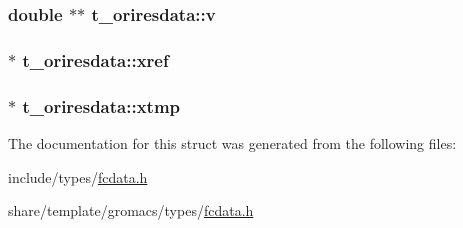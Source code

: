 \hypertarget{structt__oriresdata_a8164b713956e605372e8b0d2616bd053}{
\subsubsection[{v}]{\setlength{\rightskip}{0pt plus 5cm}double $\ast$$\ast$ {\bf t\-\_\-oriresdata\-::v}}}\label{structt__oriresdata_a8164b713956e605372e8b0d2616bd053}
\hypertarget{structt__oriresdata_a04fdaf3b7dfc576cddd0b41cc74738fc}{
\subsubsection[{xref}]{ $\ast$ {\bf t\-\_\-oriresdata\-::xref}}}\label{structt__oriresdata_a04fdaf3b7dfc576cddd0b41cc74738fc}
\hypertarget{structt__oriresdata_ab96af028b5a85f0d219e7905cc8aab70}{
\subsubsection[{xtmp}]{ $\ast$ {\bf t\-\_\-oriresdata\-::xtmp}}}\label{structt__oriresdata_ab96af028b5a85f0d219e7905cc8aab70}


\-The documentation for this struct was generated from the following files\-:\begin{DoxyCompactItemize}
\item 
include/types/\hyperlink{include_2types_2fcdata_8h}{fcdata.\-h}\item 
share/template/gromacs/types/\hyperlink{share_2template_2gromacs_2types_2fcdata_8h}{fcdata.\-h}\end{DoxyCompactItemize}
